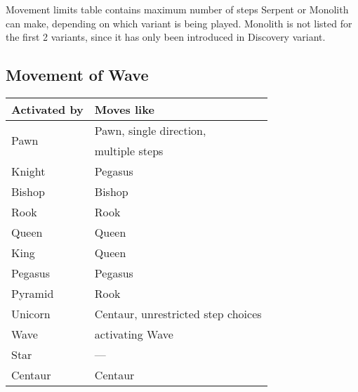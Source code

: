 Movement limits table contains maximum number of steps Serpent or Monolith can make,
depending on which variant is being played. Monolith is not listed for the first 2
variants, since it has only been introduced in Discovery variant.

\clearpage %

\subsection*{Movement of Wave}
\label{sec:Appendix/Movement of Wave}

\begin{table}[!h]
\centering
\begin{tabular}{ ll }
\toprule
\textbf{Activated by}       & \textbf{Moves like}                       \\
\midrule
\multirow{2}{*}{Pawn}       & Pawn, single direction,                   \\
                            & multiple steps                            \\ \cmidrule{1-2}
Knight                      & Pegasus                                   \\
Bishop                      & Bishop                                    \\
Rook                        & Rook                                      \\
Queen                       & Queen                                     \\
King                        & Queen                                     \\ \cmidrule{1-2}
Pegasus                     & Pegasus                                   \\
Pyramid                     & Rook                                      \\
Unicorn                     & Centaur, unrestricted step choices        \\
Wave                        & activating Wave                           \\
Star                        & ---                                       \\
Centaur                     & Centaur                                   \\\cmidrule{1-2}

\end{tabular}
\end{table}
